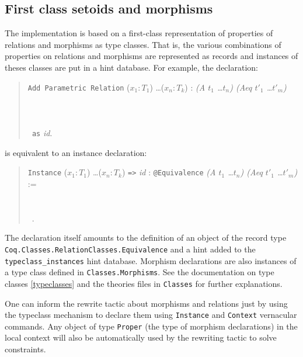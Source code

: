 \subsection{First class setoids and morphisms}
\label{setoid:first-class}

The implementation is based on a first-class representation of
properties of relations and morphisms as type classes. That is, 
the various combinations of properties on relations and morphisms 
are represented as records and instances of theses classes are put
in a hint database.
For example, the declaration:

\begin{quote}
  \texttt{Add Parametric Relation} ($x_1 : T_1$) \ldots ($x_n : T_k$) :
  \textit{(A $t_1$ \ldots $t_n$) (Aeq $t'_1$ \ldots $t'_m$)}\\
  ~\\
  ~\\
  ~\\
  \texttt{~as} \textit{id}.
\end{quote}

is equivalent to an instance declaration:

\begin{quote}
  \texttt{Instance} ($x_1 : T_1$) \ldots ($x_n : T_k$) \texttt{=>}
  \textit{id} : \texttt{@Equivalence} \textit{(A $t_1$ \ldots $t_n$) (Aeq
    $t'_1$ \ldots $t'_m$)} :=\\
  ~\\
  ~\\
  ~.
\end{quote}

The declaration itself amounts to the definition of an object of the
record type \texttt{Coq.Classes.RelationClasses.Equivalence} and a
hint added to the \texttt{typeclass\_instances} hint database. 
Morphism declarations are also instances of a type class defined in
\texttt{Classes.Morphisms}.
See the documentation on type classes \ref{typeclasses} and 
the theories files in \texttt{Classes} for further explanations. 

One can inform the rewrite tactic about morphisms and relations just by
using the typeclass mechanism to declare them using \texttt{Instance}
and \texttt{Context} vernacular commands.
Any object of type \texttt{Proper} (the type of morphism declarations)
in the local context will also be automatically used by the rewriting 
tactic to solve constraints.

